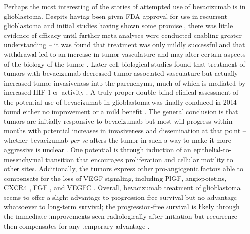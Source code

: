 Perhaps the most interesting of the stories of attempted use of bevacizumab is in glioblastoma. Despite having been given FDA approval for use in recurrent glioblastoma and initial studies having shown some promise \citep{Segerstrom2006}, there was little evidence of efficacy until further meta\hyp{}analyses were conducted enabling greater understanding -- it was found that treatment was only mildly successful and that withdrawal led to an increase in tumor vasculature and may alter certain aspects of the biology of the tumor \citep{Iwamoto2009}. Later cell biological studies found that treatment of tumors with bevacizumab decreased tumor\hyp{}associated vasculature but actually increased tumor invasiveness into the parenchyma, much of which is mediated by increased HIF\hyp{}1$\upalpha$ activity \citep{Keunen2011}. A truly proper double\hyp{}blind clinical assessment of the potential use of bevacizumab in glioblastoma was finally conduced in 2014 found either no improvement \citep{Gilbert2014} or a mild benefit \citep{Chinot2014}. The general conclusion is that tumors are initially responsive to bevacizumab but most will progress within months with potential increases in invasiveness and dissemination at that point -- whether bevacizumab \textit{per se} alters the tumor in such a way to make it more aggressive is unclear \citep{Li2017}. One potential is through induction of an epithelial\hyp{}to\hyp{}mesenchymal transition that encourages proliferation and cellular motility to other sites. Additionally, the tumors express other pro\hyp{}angiogenic factors able to compensate for the loss of VEGF signaling, including PlGF, angiopoietins, CXCR4 \citep{Xu2009a}, FGF \citep{Tamura2017}, and VEGFC \citep{Michaelsen2018, Villefranc2013, Zhao2017}. Overall, bevacizumab treatment of glioblastoma seems to offer a slight advantage to progression\hyp{}free survival but no advantage whatsoever to long\hyp{}term survival; the progression\hyp{}free survival is likely through the immediate improvements seen radiologically after initiation but recurrence then compensates for any temporary advantage \citep{Wick2017, Zhan2019}. 

